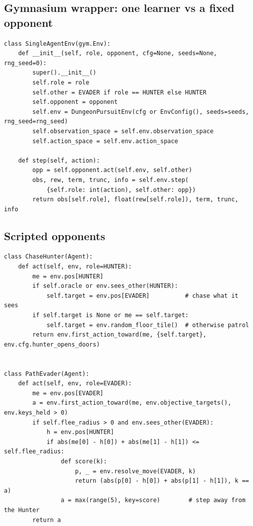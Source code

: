 \documentclass[11pt,a4paper]{article}
\newcommand{\code}[1]{\texttt{#1}}
\begin{document}
\subsection{Gymnasium wrapper: one learner vs a fixed opponent}
\begin{lstlisting}[title={\code{env/wrappers.py}}]
class SingleAgentEnv(gym.Env):
    def __init__(self, role, opponent, cfg=None, seeds=None, rng_seed=0):
        super().__init__()
        self.role = role
        self.other = EVADER if role == HUNTER else HUNTER
        self.opponent = opponent
        self.env = DungeonPursuitEnv(cfg or EnvConfig(), seeds=seeds, rng_seed=rng_seed)
        self.observation_space = self.env.observation_space
        self.action_space = self.env.action_space

    def step(self, action):
        opp = self.opponent.act(self.env, self.other)
        obs, rew, term, trunc, info = self.env.step(
            {self.role: int(action), self.other: opp})
        return obs[self.role], float(rew[self.role]), term, trunc, info
\end{lstlisting}

\subsection{Scripted opponents}
\begin{lstlisting}[title={\code{agents/scripted.py} -- Chase Hunter and Path Evader}]
class ChaseHunter(Agent):
    def act(self, env, role=HUNTER):
        me = env.pos[HUNTER]
        if self.oracle or env.sees_other(HUNTER):
            self.target = env.pos[EVADER]          # chase what it sees
        if self.target is None or me == self.target:
            self.target = env.random_floor_tile()  # otherwise patrol
        return env.first_action_toward(me, {self.target}, env.cfg.hunter_opens_doors)


class PathEvader(Agent):
    def act(self, env, role=EVADER):
        me = env.pos[EVADER]
        a = env.first_action_toward(me, env.objective_targets(), env.keys_held > 0)
        if self.flee_radius > 0 and env.sees_other(EVADER):
            h = env.pos[HUNTER]
            if abs(me[0] - h[0]) + abs(me[1] - h[1]) <= self.flee_radius:
                def score(k):
                    p, _ = env.resolve_move(EVADER, k)
                    return (abs(p[0] - h[0]) + abs(p[1] - h[1]), k == a)
                a = max(range(5), key=score)        # step away from the Hunter
        return a
\end{lstlisting}
\end{document}
